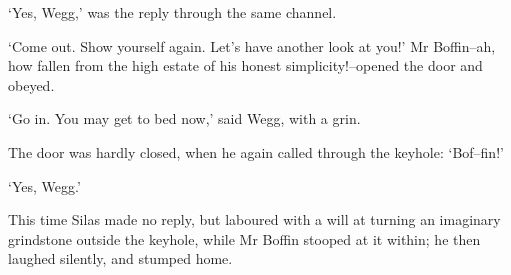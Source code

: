 ‘Yes, Wegg,’ was the reply through the same channel.

‘Come out. Show yourself again. Let’s have another look at you!’
Mr Boffin--ah, how fallen from the high estate of his honest
simplicity!--opened the door and obeyed.

‘Go in. You may get to bed now,’ said Wegg, with a grin.

The door was hardly closed, when he again called through the keyhole:
‘Bof--fin!’

‘Yes, Wegg.’

This time Silas made no reply, but laboured with a will at turning an
imaginary grindstone outside the keyhole, while Mr Boffin stooped at it
within; he then laughed silently, and stumped home.



